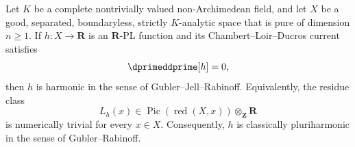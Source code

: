 \begin{proposition}
\label{prop:ch18-real-pl-zero-current-harmonic}
Let $K$ be a complete nontrivially valued non-Archimedean field, and let
$X$ be a good, separated, boundaryless, strictly $K$-analytic space that is
pure of dimension $n\geq1$.  If $h:X\to\mathbf R$ is an $\mathbf R$-PL
function and its Chambert--Loir--Ducros current satisfies
\[
                         \dprimeddprime[h]=0,
\]
then $h$ is harmonic in the sense of Gubler--Jell--Rabinoff.  Equivalently,
the residue class
\[
 L_h(x)\in\operatorname{Pic}(\operatorname{red}(X,x))
                  \otimes_{\mathbf Z}\mathbf R
\]
is numerically trivial for every $x\in X$.  Consequently, $h$ is
classically pluriharmonic in the sense of Gubler--Rabinoff.
\end{proposition}
